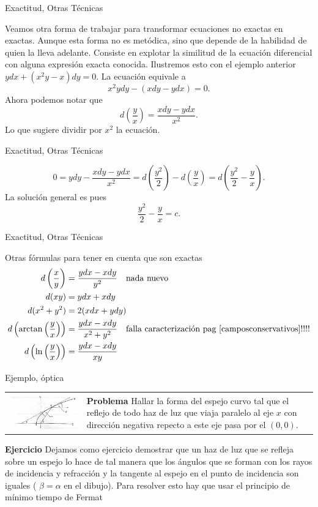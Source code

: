 \documentclass{article}
\begin{document}
{Exactitud, Otras Técnicas}

Veamos otra forma de trabajar para transformar ecuaciones no exactas en exactas. Aunque esta forma no es metódica, sino  que depende de la habilidad 
de quien la lleva adelante. Consiste en explotar la similitud de la ecuación diferencial con alguna expresión exacta conocida. Ilustremos esto con el ejemplo anterior 
$ydx+(x^2y-x)dy=0$. La ecuación equivale a
\[x^2ydy-(xdy-ydx)=0.\]
Ahora podemos notar que 
\[d\left(\frac{y}{x}\right)=\frac{xdy-ydx}{x^2}.\]
Lo que sugiere dividir por $x^2$ la ecuación.



{Exactitud, Otras Técnicas}

\[0=ydy-\frac{xdy-ydx}{x^2}=d\left(\frac{y^2}{2}\right)-d\left(\frac{y}{x}\right)=d\left(\frac{y^2}{2}-\frac{y}{x}\right).\]
La solución general es pues
\[\frac{y^2}{2}-\frac{y}{x}=c.\]



{Exactitud, Otras Técnicas}

Otras fórmulas para tener en cuenta que son exactas
 \begin{align}
  d\left(\frac{x}{y}\right)&=\frac{ydx-xdy}{y^2}\quad\text{nada nuevo} \\
  d(xy)&=ydx+xdy\\
  d(x^2+y^2)&=2(xdx+ydy)\label{eq:exacta_mod2}\\
  d\left( \arctan\left(\frac{y}{x} \right) \right)&=\frac{ydx-xdy}{x^2+y^2}\quad\text{falla caracterización pag \ref{camposconservativos}!!!!}\nonumber\\
  d\left( \ln\left(\frac{y}{x} \right) \right)&=\frac{ydx-xdy}{xy}
  \end{align}




{Ejemplo, óptica}
\begin{tabular}{m{5cm} m{4.5cm} }
\includegraphics[scale=.4]{imagenes/espejo.png} & \textbf{Problema} Hallar la forma del espejo curvo tal que el reflejo de todo haz de luz que viaja paralelo al eje $x$ con dirección
negativa repecto a este eje pasa por el $(0,0)$. \\
\end{tabular}
 \textbf{Ejercicio} Dejamos como ejercicio demostrar que un haz de luz que se refleja sobre un espejo lo hace de tal manera que los ángulos que se forman con los rayos 
de incidencia y refracción y la tangente al espejo en el punto de incidencia son iguales ( $\beta=\alpha$ en el dibujo). Para resolver esto hay que usar el principio
de mínimo tiempo de Fermat
\end{document}
